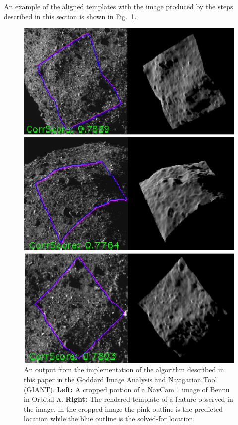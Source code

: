 \documentclass{RPI-SIW}
\begin{document}
An example of the aligned templates with the image produced by the steps described in this section is shown in Fig.~\ref{fig:sample_template}.
\begin{figure}
	\centering
	\includegraphics[width=\columnwidth]{figs/sfn_sample2.png}
    \caption{An output from the implementation of the algorithm described in this paper in the Goddard Image Analysis and Navigation Tool (GIANT). \textbf{Left:} A cropped portion of a NavCam 1\cite{tagcams} image of Bennu in Orbital A. \textbf{Right:} The rendered template of a feature observed in the image.  In the cropped image the pink outline is the predicted location while the blue outline is the solved-for location.}
	\label{fig:sample_template}
\end{figure}
\end{document}
